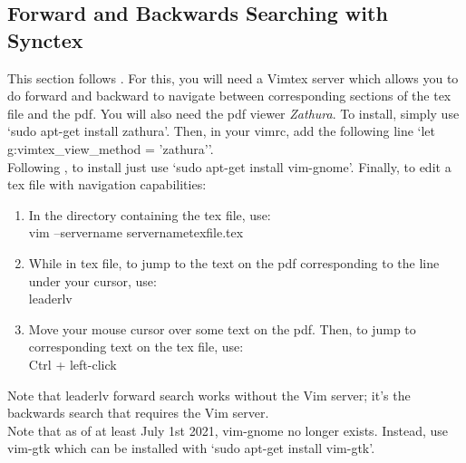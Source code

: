 \subsection{Forward and Backwards Searching with Synctex}
\label{SecFwdBckwdSynctex}
This section follows \cite{gunther2014vimtex}. For this, you will need a Vimtex
server which allows you to do forward and backward to navigate between
corresponding sections of the tex file and the pdf. You will also need the pdf
viewer \textit{Zathura}. To install, simply use `sudo apt-get install zathura'.
Then, in your vimrc, add the following line `let g:vimtex\_view\_method =
'zathura''.\\

Following \cite{lerner2004enable}, to install just use `sudo apt-get install
vim-gnome'. Finally, to edit a tex file with navigation capabilities:
\begin{enumerate}
    \item In the directory containing the tex file, use:\\
        vim --servername \tlangle servername\trangle \tlangle texfile\trangle.tex
    \item While in tex file, to jump to the text on the pdf corresponding to the
        line under your cursor, use:\\
        \tlangle leader\trangle lv
    \item Move your mouse cursor over some text on the pdf. Then, to jump to
        corresponding text on the tex file, use:\\
        Ctrl + left-click
\end{enumerate}
Note that \tlangle leader\trangle lv forward search works without the Vim
server; it's the backwards search that requires the Vim server.\\

Note that as of at least July 1st 2021, vim-gnome no longer exists.
Instead, use vim-gtk which can be installed with `sudo apt-get install
vim-gtk'.

